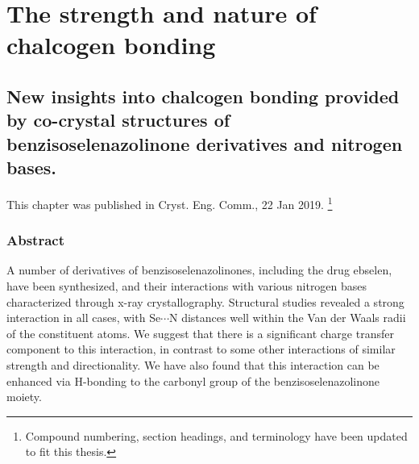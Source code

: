 \part{The strength and nature of chalcogen bonding}

\begin{refsection}

\chapter[Insights from co-crystal structures]{New insights into chalcogen bonding provided by co-crystal structures of benzisoselenazolinone derivatives and nitrogen bases.}
\label{sec:crystengcomm1}

This chapter was published in Cryst. Eng. Comm., 22 Jan 2019\autocite{Fellowes2019}. \footnote{Compound numbering, section headings, and terminology have been updated to fit this thesis.}

\section{Abstract}
A number of derivatives of benzisoselenazolinones, including the drug ebselen, have been synthesized, and their interactions with various nitrogen bases characterized through x-ray crystallography.
Structural studies revealed a strong interaction in all cases, with Se$\cdots$N distances well within the Van der Waals radii of the constituent atoms.
We suggest that there is a significant charge transfer component to this interaction, in contrast to some other interactions of similar strength and directionality.
We have also found that this interaction can be enhanced via H-bonding to the carbonyl group of the benzisoselenazolinone moiety.



\end{refsection}
